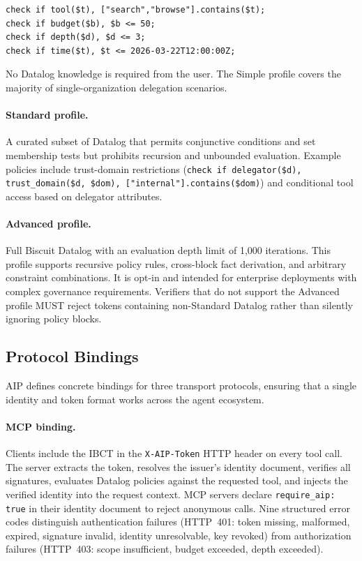 \documentclass[11pt,a4paper]{article}
\newcommand{\aip}{\textsc{AIP}}
\newcommand{\ibct}{\textsc{IBCT}}
\newcommand{\mcp}{\textsc{MCP}}
\begin{document}
\begin{lstlisting}[style=protocol]
check if tool($t), ["search","browse"].contains($t);
check if budget($b), $b <= 50;
check if depth($d), $d <= 3;
check if time($t), $t <= 2026-03-22T12:00:00Z;
\end{lstlisting}

No Datalog knowledge is required from the user. The Simple profile covers the majority of single-organization delegation scenarios.

\paragraph{Standard profile.} A curated subset of Datalog that permits conjunctive conditions and set membership tests but prohibits recursion and unbounded evaluation. Example policies include trust-domain restrictions (\texttt{check if delegator(\$d), trust\_domain(\$d, \$dom), ["internal"].contains(\$dom)}) and conditional tool access based on delegator attributes.

\paragraph{Advanced profile.} Full Biscuit Datalog with an evaluation depth limit of 1,000 iterations. This profile supports recursive policy rules, cross-block fact derivation, and arbitrary constraint combinations. It is opt-in and intended for enterprise deployments with complex governance requirements. Verifiers that do not support the Advanced profile MUST reject tokens containing non-Standard Datalog rather than silently ignoring policy blocks.

\subsection{Protocol Bindings}
\label{sec:bindings}

\aip{} defines concrete bindings for three transport protocols, ensuring that a single identity and token format works across the agent ecosystem.

\paragraph{\mcp{} binding.} Clients include the \ibct{} in the \texttt{X-AIP-Token} HTTP header on every tool call. The server extracts the token, resolves the issuer's identity document, verifies all signatures, evaluates Datalog policies against the requested tool, and injects the verified identity into the request context. \mcp{} servers declare \texttt{require\_aip: true} in their identity document to reject anonymous calls. Nine structured error codes distinguish authentication failures (HTTP~401: token missing, malformed, expired, signature invalid, identity unresolvable, key revoked) from authorization failures (HTTP~403: scope insufficient, budget exceeded, depth exceeded).
\end{document}
